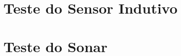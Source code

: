 \documentclass[a4paper,11pt,oneside,openany,brazilian, version=last,draft=false,]{article}
\begin{document}











%




\tableofcontents
\listoffigures


\section{Teste do Sensor Indutivo}











\section{Teste do Sonar}



















%
\end{document}
